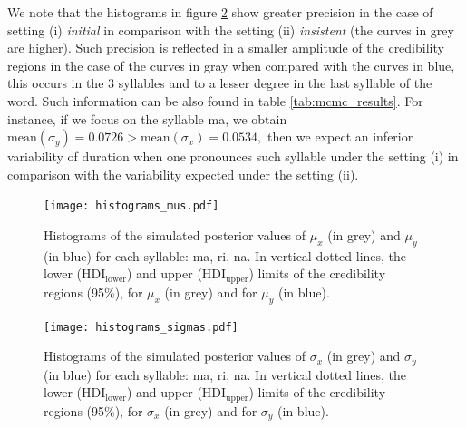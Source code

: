 \documentclass[11pt]{article}
\begin{document}
We note that the histograms in figure \ref{fig:histograms_sigmas_mcmc} show greater precision in the case of setting (i) {\it{initial}} in comparison with the setting (ii) {\it{insistent}} (the curves in grey are higher). Such precision is reflected in a smaller amplitude of the credibility regions in the case of the curves in gray when compared with the curves in blue, this occurs in the 3 syllables and to a lesser degree in the last syllable of the word. Such information can be also found in table \ref{tab:mcmc_results}. For instance, if we focus on the syllable ma, we obtain $\mbox{mean}(\sigma_y)=0.0726>\mbox{mean}(\sigma_x)=0.0534,$ then we expect an inferior variability of duration when one pronounces such syllable under the setting (i) in comparison with the variability expected under the setting (ii).

\begin{figure}[!htb]
    \centering
    \texttt{[image: histograms\_mus.pdf]}
    \caption{Histograms of the simulated posterior values of $\mu_x$ (in grey) and $\mu_y$ (in blue) for each syllable: ma, ri, na. In vertical dotted lines, the lower ($\mbox{HDI}_{\mbox{lower}}$) and upper ($\mbox{HDI}_{\mbox{upper}}$) limits of the credibility regions (95\%), for $\mu_x$ (in grey) and for $\mu_y$ (in blue).}
    \label{fig:histograms_mus_mcmc}
\end{figure}

\vspace{15mm}

\begin{figure}[!htb]
    \centering
    \texttt{[image: histograms\_sigmas.pdf]}
    \caption{Histograms of the simulated posterior values of $\sigma_x$ (in grey) and $\sigma_y$ (in blue) for each syllable: ma, ri, na. In vertical dotted lines, the lower ($\mbox{HDI}_{\mbox{lower}}$) and upper ($\mbox{HDI}_{\mbox{upper}}$) limits of the credibility regions (95\%), for $\sigma_x$ (in grey) and for $\sigma_y$ (in blue).}
    \label{fig:histograms_sigmas_mcmc}
\end{figure}

\vspace{15mm}





\end{document}
